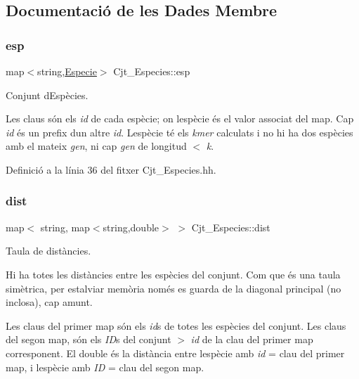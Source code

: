 \subsection{Documentació de les Dades Membre}
\mbox{\label{class_cjt___especies_aa232ab8543b78ea6d8ecaa1e5f9ccef5}} 
\subsubsection{\texorpdfstring{esp}{esp}}
{\footnotesize\ttfamily map$<$string,\hyperlink{class_especie}{Especie}$>$ Cjt\+\_\+\+Especies\+::esp\hspace{0.3cm}{\ttfamily [private]}}



Conjunt d\textquotesingle{}Espècies. 

Les claus són els {\itshape id} de cada espècie; on l\textquotesingle{}espècie és el valor associat del map. Cap {\itshape id} és un prefix d\textquotesingle{}un altre {\itshape id}. L\textquotesingle{}espècie té els {\itshape kmer} calculats i no hi ha dos espècies amb el mateix {\itshape gen}, ni cap {\itshape gen} de longitud $<$ {\itshape k}. 

Definició a la línia 36 del fitxer Cjt\+\_\+\+Especies.\+hh.

\mbox{\label{class_cjt___especies_aaf5d15b706e8b0c5b910283d60ef58a6}} 
\subsubsection{\texorpdfstring{dist}{dist}}
{\footnotesize\ttfamily map$<$ string, map$<$string,double$>$ $>$ Cjt\+\_\+\+Especies\+::dist\hspace{0.3cm}{\ttfamily [private]}}



Taula de distàncies. 

Hi ha totes les distàncies entre les espècies del conjunt. Com que és una taula simètrica, per estalviar memòria només es guarda de la diagonal principal (no inclosa), cap amunt.

Les claus del primer map són els {\itshape id}s de totes les espècies del conjunt. Les claus del segon map, són els {\itshape ID}s del conjunt $>$ {\itshape id} de la clau del primer map corresponent. El double és la distància entre l\textquotesingle{}espècie amb {\itshape id} = clau del primer map, i l\textquotesingle{}espècie amb {\itshape ID} = clau del segon map. 

